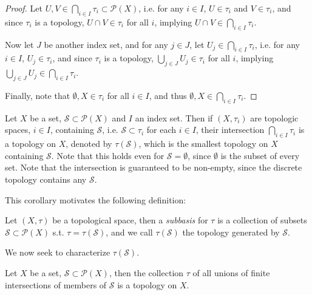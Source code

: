 \begin{proof}
	Let $U, V\in \bigcap_{i\in I}\tau_i \subset \mathcal P(X)$, i.e. for any $i\in I$, $U\in\tau_i$ and $V\in \tau_i$, and since $\tau_i$ is a topology, $U\cap V\in\tau_i$ for all $i$, implying $U\cap V\in\bigcap_{i\in I}\tau_i$.
	
	Now let $J$ be another index set, and for any $j\in J$, let $U_j\in \bigcap_{i\in I}\tau_i$, i.e. for any $i\in I$, $U_j\in \tau_i$, and since $\tau_i$ is a topology, $\bigcup_{j\in J}U_j\in \tau_i$ for all $i$, implying $\bigcup_{j\in J}U_j\in \bigcap_{i\in I}\tau_i$.
	
	Finally, note that $\emptyset, X\in \tau_i$ for all $i\in I$, and thus $\emptyset, X\in \bigcap_{i\in I}\tau_i$.
\end{proof}

\begin{corollary}\label{corollary:intersection_topology_containing_subset}
	Let $X$ be a set, $\mathscr S\subset \mathscr P(X)$ and $I$ an index set. Then if $(X, \tau_i)$ are topologic spaces, $i\in I$, containing $\mathscr S$, i.e. $\mathscr S\subset \tau_i$ for each $i\in I$, their intersection $\bigcap_{i\in I}\tau_i$ is a topology on $X$, denoted by $\tau(\mathscr S)$, which is the smallest topology on $X$ containing $\mathscr S$. Note that this holds even for $\mathscr S = \emptyset$, since $\emptyset$ is the subset of every set. Note that the intersection is guaranteed to be non-empty, since the discrete topology contains any $\mathscr S$. 
\end{corollary}

This corollary motivates the following definition:

\begin{defn}
	Let $(X, \tau)$ be a topological space, then a \textit{subbasis} for $\tau$ is a collection of subsets $\mathscr S\subset \mathscr P(X)$ s.t. $\tau = \tau(\mathscr S)$, and we call $\tau(\mathscr S)$ the topology generated by $\mathscr S$.
\end{defn}

We now seek to characterize $\tau(\mathscr S)$. 

\begin{theorem}\label{thrm:top_gen_by_subbasis_charac}
	Let $X$ be a set, $\mathscr S\subset \mathscr P(X)$, then the collection $\tau$ of all unions of finite intersections of members of $\mathscr S$ is a topology on $X$.
\end{theorem}

